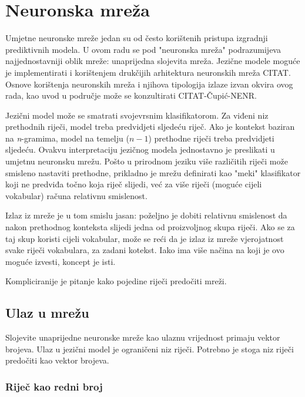 \documentclass[times, utf8, diplomski, numeric]{fer}
\begin{document}
\chapter{Neuronska mreža}

Umjetne neuronske mreže jedan su od često korištenih pristupa izgradnji prediktivnih modela. U ovom radu se pod "neuronska mreža" podrazumijeva najjednostavniji oblik mreže: unaprijedna slojevita mreža. Jezične modele moguće je implementirati i korištenjem drukčijih arhitektura neuronskih mreža CITAT. Osnove korištenja neuronskih mreža i njihova tipologija izlaze izvan okvira ovog rada, kao uvod u područje može se konzultirati CITAT-Čupić-NENR.

Jezični model može se smatrati svojevrsnim klasifikatorom. Za viđeni niz prethodnih riječi, model treba predvidjeti sljedeću riječ. Ako je kontekst baziran na \textit{n}-gramima, model na temelju ($n - 1$) prethodne riječi treba predvidjeti sljedeću. Ovakvu interpretaciju jezičnog modela jednostavno je preslikati u umjetnu neuronsku mrežu. Pošto u prirodnom jeziku više različitih riječi može smisleno nastaviti prethodne, prikladno je mrežu definirati kao "meki" klasifikator koji ne predviđa točno koja riječ slijedi, već za više riječi (moguće cijeli vokabular) računa relativnu smislenost.

Izlaz iz mreže je u tom smislu jasan: poželjno je dobiti relativnu smislenost da nakon prethodnog konteksta slijedi jedna od proizvoljnog skupa riječi. Ako se za taj skup koristi cijeli vokabular, može se reći da je izlaz iz mreže vjerojatnost svake riječi vokabulara, za zadani kotekst. Iako ima više načina na koji je ovo moguće izvesti, koncept je isti.

Kompliciranije je pitanje kako pojedine riječi predočiti mreži.

\section{Ulaz u mrežu}
\label{sec:lnnet_input}
Slojevite unaprijedne neuronske mreže kao ulaznu vrijednost primaju vektor brojeva. Ulaz u jezični model je ograničeni niz riječi. Potrebno je stoga niz riječi predočiti kao vektor brojeva.

\subsection{Riječ kao redni broj}
\end{document}
